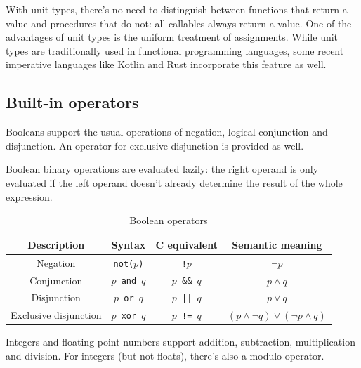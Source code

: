 \documentclass[UdineBachThesis,american,11pt]{PhdThesis}
\begin{document}
  With unit types, there's no need to distinguish between functions that return
  a value and procedures that do not: all callables always return a value. One
  of the advantages of unit types is the uniform treatment of assignments. While
  unit types are traditionally used in functional programming languages, some
  recent imperative languages like Kotlin and Rust incorporate this feature as
  well.

  \subsection{Built-in operators}

  Booleans support the usual operations of negation, logical conjunction and
  disjunction. An operator for exclusive disjunction is provided as well.

  Boolean binary operations are evaluated lazily: the right operand is only
  evaluated if the left operand doesn't already determine the result of the
  whole expression.

  \begin{table}[H]
    \centering

    \begin{tabular}{|c|c|c|c|}
      \hline

      Description &
      Syntax &
      C equivalent &
      Semantic meaning \\
      \hline

      Negation &
      \texttt{not($p$)} &
      \texttt{!$p$} &
      $\lnot p$ \\

      Conjunction &
      \texttt{$p$ and $q$} &
      \texttt{$p$ \&\& $q$} &
      $p \land q$ \\

      Disjunction &
      \texttt{$p$ or $q$} &
      \texttt{$p$ || $q$} &
      $p \lor q$ \\

      Exclusive disjunction &
      \texttt{$p$ xor $q$} &
      \texttt{$p$ != $q$} &
      $\left(p \land \lnot q\right) \lor \left(\lnot p \land q\right)$ \\
      \hline
    \end{tabular}

    \caption{Boolean operators}
  \end{table}

  Integers and floating-point numbers support addition, subtraction,
  multiplication and division. For integers (but not floats), there's also a
  modulo operator.
\end{document}
